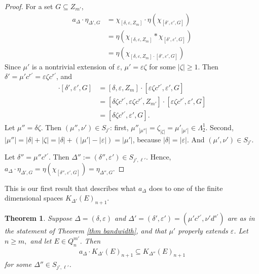 \documentclass[12pt]{amsart}
\newcommand{\sse}{\subseteq}
\newcommand{\de}{\delta}
\newcommand{\De}{\Delta}
\newcommand{\ep}{\varepsilon}
\newcommand{\ze}{\zeta}
\newcommand{\La}{\Lambda}
\theoremstyle{plain} %
\newtheorem{Theorem}{Theorem}[section]
\theoremstyle{definition} %
\begin{document}
\begin{proof}
For a set $G \sse Z_{m'}$,
\begin{align*}
    a_{\De} \cdot \eta_{\De', G} &= \chi_{[\de, \ep, Z_m]} \cdot \eta( \chi_{[\de', \ep', G]})\\
    &= \eta( \chi_{[\de, \ep, Z_m]} * \chi_{[\de', \ep', G]})\\
    &= \eta( \chi_{[\de, \ep, Z_m] \cdot [\de', \ep', G]})
\end{align*}
    Since $\mu'$ is a nontrivial extension of $\ep$, $\mu' = \ep \ze$ for some $|\ze| \ge 1$.
Then $\de' = \mu' c^{r'} = \ep \ze c^{r'}$, and
\begin{align*}
    [\de, \ep, Z_m] \cdot [\de', \ep', G] &= [\de, \ep, Z_m] \cdot [\ep \ze c^{r'}, \ep', G]\\
    &= [\de \ze c^{r'}, \ep \ze c^{r'}, Z_{m'}] \cdot [\ep \ze c^{r'}, \ep', G]\\
    &= [\de \ze c^{r'}, \ep', G].
\end{align*}
Let $\mu'' = \de \ze$. Then $(\mu'', \nu') \in S_{j'}$: first, $\mu''_{|\mu''|} = \ze_{|\ze|} = \mu'_{|\mu'|} \in \La_2^1$. Second, $|\mu''| = |\de| + |\ze| = |\de| + (|\mu'| - |\ep|) = |\mu'|$, because $|\de| = |\ep|$. And $(\mu', \nu') \in S_{j'}$.

Let $\de'' = \mu'' c^{r'}$. Then $\De'' := (\de'', \ep') \in S_{j', \ell'}$. Hence, $a_{\De} \cdot \eta_{\De', G} = \eta(\chi_{[\de'', \ep', G]}) = \eta_{\De'', G}$.
\end{proof}

This is our first result that describes what $a_{\De}$ does to one of the finite dimensional spaces $K_{\De'}(E)_{n+1}$.

\begin{Theorem}\label{thm a acts on K 1}
    Suppose $\De = (\de, \ep)$ and $\De' = (\de', \ep') = (\mu'c^{r'}, \nu' d^{s'})$ are as in the statement of Theorem \ref{thm bandwidth},
    and that $\mu'$ properly extends $\ep$. Let $n \geq m,$ and let $E \in Q_n^{m'}$.  Then
    \begin{align*}
        a_{\De} \cdot K_{\De'}(E)_{n+1} \sse K_{\De''}(E)_{n+1}
    \end{align*}
    for some $\De'' \in S_{j', \ell'}$.
\end{Theorem}
\end{document}
